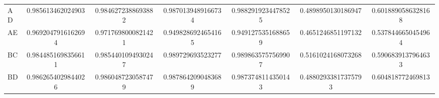 \documentclass[a4paper]{article}
\begin{document}
\begin{table}[H]
{\begin{tabular}{lcccccc}
                AD               & 0.985613462024903                                                                          & 0.9846272388693882                                                                          & 0.9870139489166734                                                                            & 0.9882919234478525                                                                             & 0.4898950130186947                                                                             & 0.6018890586328168                                                                              \\
                AE               & 0.9692047916162694                                                                         & 0.9717698000821421                                                                          & 0.9498286924654165                                                                            & 0.9491275351688659                                                                             & 0.4651246851197132                                                                             & 0.5378446650454964                                                                              \\
                BC               & 0.9844851698356611                                                                         & 0.9854401094930247                                                                          & 0.989729693523277                                                                             & 0.9898635757569907                                                                             & 0.5161024168073268                                                                             & 0.5906839137964633                                                                              \\
                BD               & 0.9862654029844026                                                                         & 0.9860487230587479                                                                          & 0.9878642090483689                                                                            & 0.9873748114350143                                                                             & 0.48802933817375793                                                                            & 0.604818772469813                                                                               \\

\end{tabular}}
\end{table}
\end{document}

